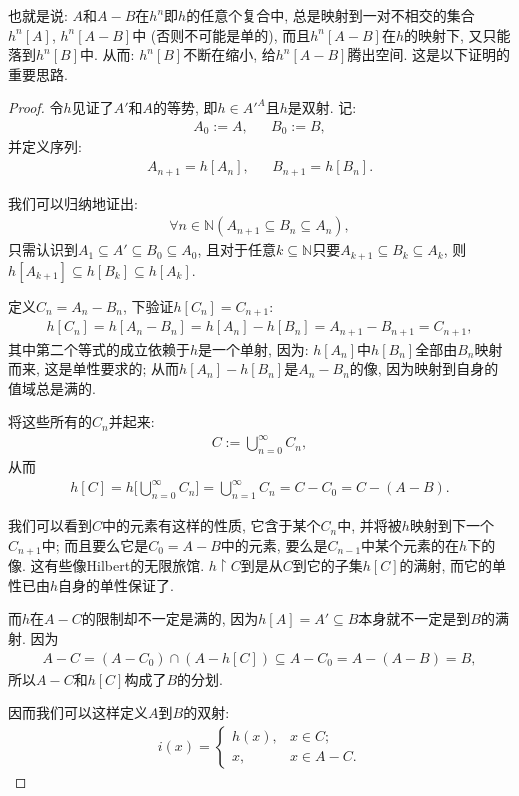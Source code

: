 \documentclass[openany]{ctexbook}
\theoremstyle{plain}
\theoremstyle{definition}
\begin{document}
也就是说: $A$和$A-B$在$h^n$即$h$的任意个复合中, 总是映射到一对不相交的集合$h^n[A]$, $h^n[A-B]$中 (否则不可能是单的), 而且$h^n[A-B]$在$h$的映射下, 又只能落到$h^n[B]$中. 
从而: $h^n[B]$不断在缩小, 给$h^n[A-B]$腾出空间. 
这是以下证明的重要思路.
\begin{proof}
令$h$见证了$A'$和$A$的等势, 即$h\in A'^A$且$h$是双射.
记:
\begin{align*}
	A_0 := A, && 
	B_0 := B,
\end{align*}
并定义序列:
\begin{align*}
	A_{n+1}=h[A_n], &&
	B_{n+1}=h[B_n].
\end{align*}

我们可以归纳地证出:
\begin{align*}
	\forall n\in \mathbb N(
		A_{n+1}\subseteq B_n \subseteq A_n),
\end{align*}
只需认识到$A_1\subseteq A' \subseteq B_0\subseteq A_0$, 
且对于任意$k\subseteq \mathbb N$只要$A_{k+1}\subseteq B_k \subseteq A_k$,
	则$h[A_{k+1}]\subseteq h[B_k]\subseteq  h[A_k]$.
	
定义$C_n = A_n - B_n$, 下验证$h[C_n] = C_{n+1}$: 
\begin{align*}
	h[C_n] = h[A_n - B_n] = h[A_n] - h[B_n] = A_{n+1} - B_{n+1} = C_{n+1}, 
\end{align*}
其中第二个等式的成立依赖于$h$是一个单射, 因为: $h[A_n] $中$h[B_n]$全部由$B_n$映射而来, 这是单性要求的; 从而$h[A_n]-h[B_n]$是$A_n-B_n$的像, 因为映射到自身的值域总是满的.

将这些所有的$C_n$并起来:
\begin{align*}
	C:=\bigcup^\infty_{n=0} C_n,
\end{align*}
从而
\begin{align*}
	h[C] = h\bigg\lbrack\bigcup^\infty_{n=0} C_n\bigg\rbrack = \bigcup^\infty_{n=1} C_n = C - C_0 = C- (A-B).
\end{align*}

我们可以看到$C$中的元素有这样的性质, 它含于某个$C_n$中, 并将被$h$映射到下一个$C_{n+1}$中; 而且要么它是$C_0=A-B$中的元素, 要么是$C_{n-1}$中某个元素的在$h$下的像. 这有些像Hilbert的无限旅馆. $h\upharpoonright C$到是从$C$到它的子集$h[C]$的满射, 而它的单性已由$h$自身的单性保证了. 

而$h$在$A-C$的限制却不一定是满的, 因为$h[A]=A'\subseteq B$本身就不一定是到$B$的满射. 因为
\begin{align*}
	A-C = (A - C_0) \cap (A-h[C]) \subseteq A-C_0 = A-(A-B) =B,
\end{align*}
所以$A-C$和$h[C]$构成了$B$的分划.

因而我们可以这样定义$A$到$B$的双射:
\begin{align*}
	i(x)=
	\begin{cases}
	h(x), & x\in C;\\
	x, & x\in A-C.
	\end{cases}
\end{align*}
\end{proof}
\end{document}
